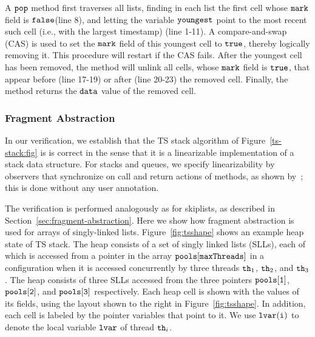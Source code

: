 A ${\tt pop}$ method first traverses all lists, finding in each list
the first cell whose ${\tt mark}$ field is ${\tt false}$(line 8), and letting the variable ${\tt youngest}$ point to the most recent such cell
(i.e., with the largest timestamp) (line 1-11).
A compare-and-swap (CAS) is used
to set the ${\tt mark}$ field of this youngest cell to ${\tt true}$,
thereby logically removing it.
This procedure will restart if the CAS fails. After the youngest cell has been removed, the method will unlink all cells, whose ${\tt mark}$ field is ${\tt true}$,
that appear before (line 17-19) or after (line 20-23) the removed cell.
Finally, the method returns the ${\tt data}$ value of the removed cell.

\subsubsection{Fragment Abstraction}
In our verification, we establish that the TS stack algorithm of
Figure~\ref{ts-stack:fig} is is correct in the sense that it is a
linearizable implementation of a stack data structure.
For stacks and queues, we specify linearizability by 
 observers that synchronize on call and return actions of
  methods, as shown by~\cite{BEEH:icalp15}; this is done without
 any user annotation.

 The verification is performed analogously as for skiplists, as described
 in Section~\ref{sec:fragment-abstraction}. Here we show how fragment
 abstraction is used for arrays of singly-linked lists.
Figure~\ref{fig:tsshape} shows an  example heap state of TS stack.
The heap consists of a set of singly linked lists (SLLs), each of which
is accessed from a pointer in the array ${\tt pools[maxThreads]}$
in a configuration when %
it is accessed concurrently by three threads ${\tt th}_1$, ${\tt th}_2$, and ${\tt th}_3$. The heap consists of three SLLs accessed from the three pointers $\tt pools[1]$, $\tt pools[2]$, and $\tt pools[3]$ respectively. Each heap cell is
shown with the values of its fields, using the layout shown to the right in
Figure~\ref{fig:tsshape}.
In addition, each cell is labeled by the pointer variables that point to it.
We use ${\tt lvar(i)}$ to denote the local
variable ${\tt lvar}$ of thread ${\tt th}_i$.

